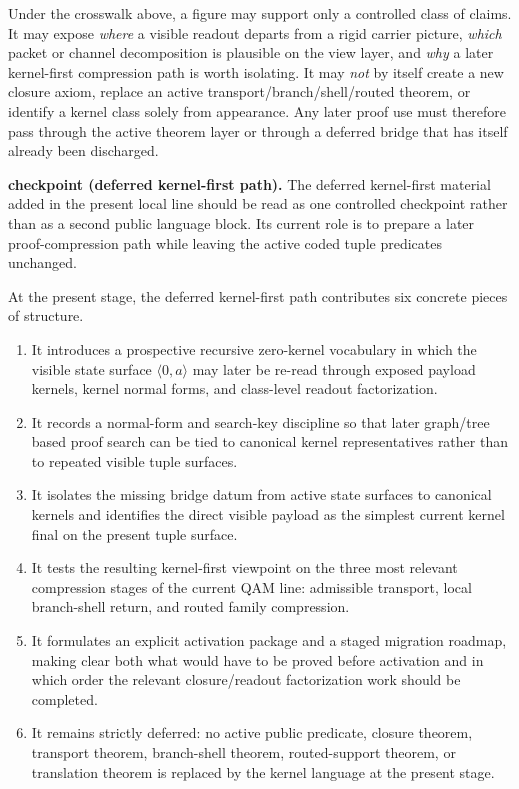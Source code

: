\begin{remark}\label{rem:qam-vm-os-visual-discipline}
Under the crosswalk above, a figure may support only a controlled class of claims. It may expose \emph{where} a visible readout departs from a rigid carrier picture, \emph{which} packet or channel decomposition is plausible on the view layer, and \emph{why} a later kernel-first compression path is worth isolating. It may \emph{not} by itself create a new closure axiom, replace an active transport/branch/shell/routed theorem, or identify a kernel class solely from appearance. Any later proof use must therefore pass through the active theorem layer or through a deferred bridge that has itself already been discharged.
\end{remark}


\noindent\textbf{ checkpoint (deferred kernel-first path).} The deferred kernel-first material added in the present local  line should be read as one controlled checkpoint rather than as a second public language block. Its current role is to prepare a later proof-compression path while leaving the active coded tuple predicates unchanged.

\begin{remark}\label{rem:qam-zero-kernel-checkpoint}
At the present stage, the deferred kernel-first path contributes six concrete pieces of structure.
\begin{enumerate}[leftmargin=2em]
 \item It introduces a prospective recursive zero-kernel vocabulary in which the visible state surface $\langle 0,a\rangle$ may later be re-read through exposed payload kernels, kernel normal forms, and class-level readout factorization.
 \item It records a normal-form and search-key discipline so that later graph/tree based proof search can be tied to canonical kernel representatives rather than to repeated visible tuple surfaces.
 \item It isolates the missing bridge datum from active state surfaces to canonical kernels and identifies the direct visible payload as the simplest current kernel final on the present tuple surface.
 \item It tests the resulting kernel-first viewpoint on the three most relevant compression stages of the current QAM line: admissible transport, local branch-shell return, and routed family compression.
 \item It formulates an explicit activation package and a staged migration roadmap, making clear both what would have to be proved before activation and in which order the relevant closure/readout factorization work should be completed.
 \item It remains strictly deferred: no active public predicate, closure theorem, transport theorem, branch-shell theorem, routed-support theorem, or translation theorem is replaced by the kernel language at the present stage.
\end{enumerate}
\end{remark}

